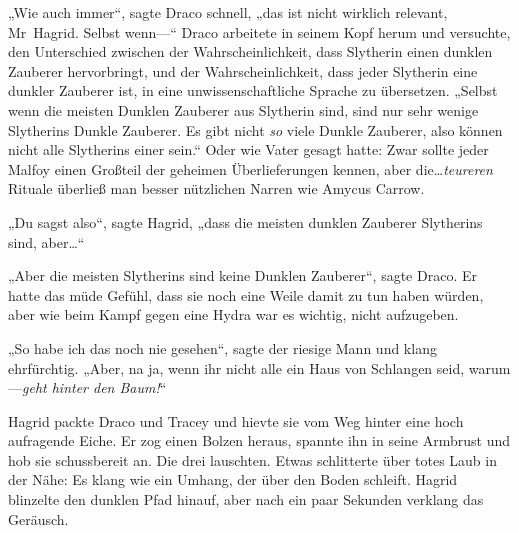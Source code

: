 „Wie auch immer“, sagte Draco schnell, „das ist nicht wirklich relevant, Mr~Hagrid. Selbst wenn—“ Draco arbeitete in seinem Kopf herum und versuchte, den Unterschied zwischen der Wahrscheinlichkeit, dass Slytherin einen dunklen Zauberer hervorbringt, und der Wahrscheinlichkeit, dass jeder Slytherin eine dunkler Zauberer ist, in eine unwissenschaftliche Sprache zu übersetzen.
„Selbst wenn die meisten Dunklen Zauberer aus Slytherin sind, sind nur sehr wenige Slytherins Dunkle Zauberer. Es gibt nicht \emph{so} viele Dunkle Zauberer, also können nicht alle Slytherins einer sein.“
Oder wie Vater gesagt hatte: Zwar sollte jeder Malfoy einen Großteil der geheimen Überlieferungen kennen, aber die…\emph{teureren} Rituale überließ man besser nützlichen Narren wie Amycus Carrow.

„Du sagst also“, sagte Hagrid, „dass die meisten dunklen Zauberer Slytherins sind, aber…“

„Aber die meisten Slytherins sind keine Dunklen Zauberer“, sagte Draco.
Er hatte das müde Gefühl, dass sie noch eine Weile damit zu tun haben würden, aber wie beim Kampf gegen eine Hydra war es wichtig, nicht aufzugeben.

„So habe ich das noch nie gesehen“, sagte der riesige Mann und klang ehrfürchtig. „Aber, na ja, wenn ihr nicht alle ein Haus von Schlangen seid, warum—\emph{geht hinter den Baum!}“

Hagrid packte Draco und Tracey und hievte sie vom Weg hinter eine hoch aufragende Eiche. Er zog einen Bolzen heraus, spannte ihn in seine Armbrust und hob sie schussbereit an.
Die drei lauschten. Etwas schlitterte über totes Laub in der Nähe: Es klang wie ein Umhang, der über den Boden schleift. Hagrid blinzelte den dunklen Pfad hinauf, aber nach ein paar Sekunden verklang das Geräusch.

